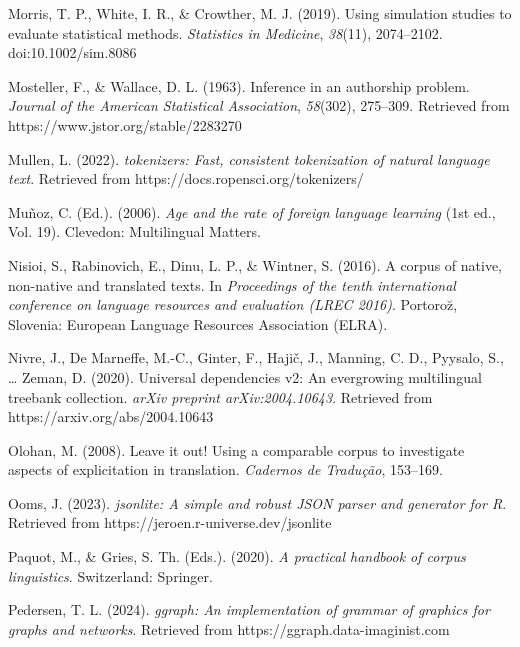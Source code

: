 \documentclass[
  letterpaper,
  krantz1]{latex/krantz-mod}
\newlength{\cslhangindent}
\newenvironment{CSLReferences}[2] %
 {\begin{list}{}{%
  \setlength{\itemindent}{0pt}
  \setlength{\leftmargin}{0pt}
  \setlength{\parsep}{0pt}
  \ifodd #1
   \setlength{\leftmargin}{\cslhangindent}
   \setlength{\itemindent}{-1\cslhangindent}
  \fi
  \setlength{\itemsep}{#2\baselineskip}}}
 {\end{list}}
\theoremstyle{definition}
\theoremstyle{definition}
\theoremstyle{remark}
\begin{document}
\begin{CSLReferences}{1}{0}
Morris, T. P., White, I. R., \& Crowther, M. J. (2019). Using simulation
studies to evaluate statistical methods. \emph{Statistics in Medicine},
\emph{38}(11), 2074--2102. doi:10.1002/sim.8086

Mosteller, F., \& Wallace, D. L. (1963). Inference in an authorship
problem. \emph{Journal of the American Statistical Association},
\emph{58}(302), 275--309. Retrieved from
https://www.jstor.org/stable/2283270

Mullen, L. (2022). \emph{{tokenizers}: Fast, consistent tokenization of
natural language text}. Retrieved from
https://docs.ropensci.org/tokenizers/

Muñoz, C. (Ed.). (2006). \emph{Age and the rate of foreign language
learning} (1st ed., Vol. 19). Clevedon: Multilingual Matters.

Nisioi, S., Rabinovich, E., Dinu, L. P., \& Wintner, S. (2016). A corpus
of native, non-native and translated texts. In \emph{Proceedings of the
tenth international conference on language resources and evaluation
({LREC} 2016)}. Portoro{z̆}, Slovenia: European Language Resources
Association (ELRA).

Nivre, J., De Marneffe, M.-C., Ginter, F., Hajič, J., Manning, C. D.,
Pyysalo, S., \ldots{} Zeman, D. (2020). Universal dependencies v2: {An}
evergrowing multilingual treebank collection. \emph{arXiv preprint
arXiv:2004.10643}. Retrieved from https://arxiv.org/abs/2004.10643

Olohan, M. (2008). Leave it out! {Using} a comparable corpus to
investigate aspects of explicitation in translation. \emph{Cadernos de
Tradu{ç}{ã}o}, 153--169.

Ooms, J. (2023). \emph{{jsonlite}: A simple and robust {JSON} parser and
generator for {R}}. Retrieved from
https://jeroen.r-universe.dev/jsonlite

Paquot, M., \& Gries, S. Th. (Eds.). (2020). \emph{A practical handbook
of corpus linguistics}. Switzerland: Springer.

Pedersen, T. L. (2024). \emph{{ggraph}: An implementation of grammar of
graphics for graphs and networks}. Retrieved from
https://ggraph.data-imaginist.com


\end{CSLReferences}
\end{document}
